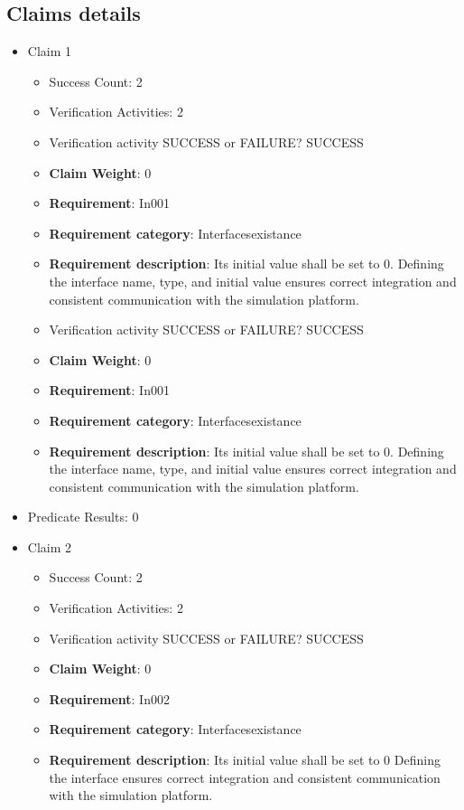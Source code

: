 \documentclass{article}
\begin{document}
			\subsection{Claims details}
			\begin{itemize}
  				  \item Claim 1
				\begin{itemize}
			    	\item Success Count: 2 
			    	\item Verification Activities: 2
					\item Verification activity SUCCESS or FAILURE? SUCCESS
					\item \textbf{Claim Weight}: 0
						\item \textbf{Requirement}: In001 
						\item \textbf{Requirement category}: Interfacesexistance 
						\item \textbf{Requirement description}: Its initial value shall be set to 0. Defining the interface name, type, and initial value ensures correct integration and consistent communication with the simulation platform.
					
					\item Verification activity SUCCESS or FAILURE? SUCCESS
					\item \textbf{Claim Weight}: 0
						\item \textbf{Requirement}: In001 
						\item \textbf{Requirement category}: Interfacesexistance 
						\item \textbf{Requirement description}: Its initial value shall be set to 0. Defining the interface name, type, and initial value ensures correct integration and consistent communication with the simulation platform.
					
				\end{itemize}
				
									    
				\item Predicate Results: 0

  				  \item Claim 2
				\begin{itemize}
			    	\item Success Count: 2 
			    	\item Verification Activities: 2
					\item Verification activity SUCCESS or FAILURE? SUCCESS
					\item \textbf{Claim Weight}: 0
						\item \textbf{Requirement}: In002 
						\item \textbf{Requirement category}: Interfacesexistance 
						\item \textbf{Requirement description}: Its initial value shall be set to 0 Defining the interface ensures correct integration and consistent communication with the simulation platform.
					

\end{itemize}
\end{itemize}
\end{document}
